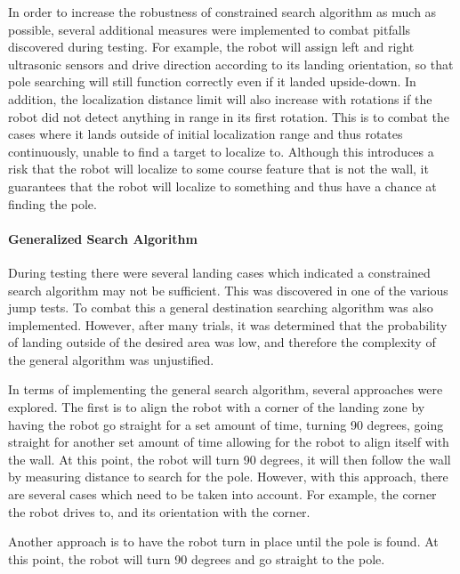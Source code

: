 \documentclass[ece]{uw-wkrpt}
\begin{document}
In order to increase the robustness of constrained search algorithm as much as possible, several additional measures were implemented to combat pitfalls discovered during testing. For example, the robot will assign left and right ultrasonic sensors and drive direction according to its landing orientation, so that pole searching will still function correctly even if it landed upside-down. In addition, the localization distance limit will also increase with rotations if the robot did not detect anything in range in its first rotation. This is to combat the cases where it lands outside of initial localization range and thus rotates continuously, unable to find a target to localize to. Although this introduces a risk that the robot will localize to some course feature that is not the wall, it guarantees that the robot will localize to something and thus have a chance at finding the pole. 

\paragraph{Generalized Search Algorithm}

During testing there were several landing cases which indicated a constrained search algorithm may not be sufficient. This was discovered in one of the various jump tests. To combat this a general destination searching algorithm was also implemented. However, after many trials, it was determined that the probability of landing outside of the desired area was low, and therefore the complexity of the general algorithm was unjustified.

In terms of implementing the general search algorithm, several approaches were explored. The first is to align the robot with a corner of the landing zone by having the robot go straight for a set amount of time, turning 90 degrees, going straight for another set amount of time allowing for the robot to align itself with the wall. At this point, the robot will turn 90 degrees, it will then follow the wall by measuring distance to search for the pole. However, with this approach, there are several cases which need to be taken into account. For example, the corner the robot drives to, and its orientation with the corner. 

Another approach is to have the robot turn in place until the pole is found. At this point, the robot will turn 90 degrees and go straight to the pole. 
\end{document}
